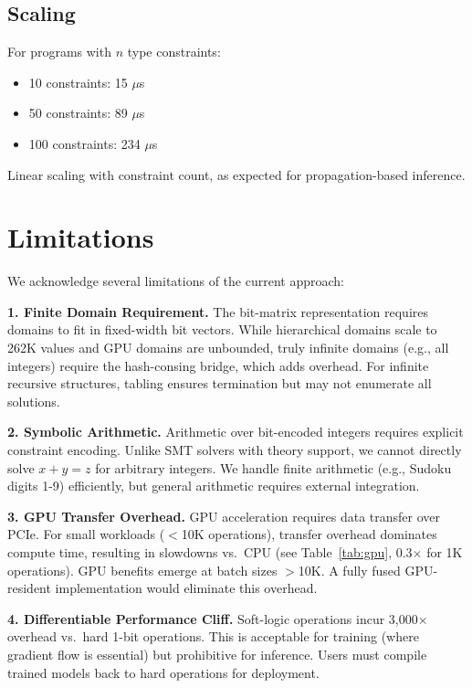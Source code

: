 \documentclass[11pt,a4paper]{article}
\begin{document}
\subsection{Scaling}

For programs with $n$ type constraints:
\begin{itemize}
  \item 10 constraints: 15 $\mu$s
  \item 50 constraints: 89 $\mu$s
  \item 100 constraints: 234 $\mu$s
\end{itemize}

Linear scaling with constraint count, as expected for propagation-based inference.

\section{Limitations}

We acknowledge several limitations of the current approach:

\textbf{1. Finite Domain Requirement.}
The bit-matrix representation requires domains to fit in fixed-width bit vectors.
While hierarchical domains scale to 262K values and GPU domains are unbounded, truly infinite domains (e.g., all integers) require the hash-consing bridge, which adds overhead.
For infinite recursive structures, tabling ensures termination but may not enumerate all solutions.

\textbf{2. Symbolic Arithmetic.}
Arithmetic over bit-encoded integers requires explicit constraint encoding.
Unlike SMT solvers with theory support, we cannot directly solve $x + y = z$ for arbitrary integers.
We handle finite arithmetic (e.g., Sudoku digits 1-9) efficiently, but general arithmetic requires external integration.

\textbf{3. GPU Transfer Overhead.}
GPU acceleration requires data transfer over PCIe.
For small workloads ($<$10K operations), transfer overhead dominates compute time, resulting in slowdowns vs.\ CPU (see Table~\ref{tab:gpu}, 0.3$\times$ for 1K operations).
GPU benefits emerge at batch sizes $>$10K.
A fully fused GPU-resident implementation would eliminate this overhead.

\textbf{4. Differentiable Performance Cliff.}
Soft-logic operations incur 3,000$\times$ overhead vs.\ hard 1-bit operations.
This is acceptable for training (where gradient flow is essential) but prohibitive for inference.
Users must compile trained models back to hard operations for deployment.
\end{document}
